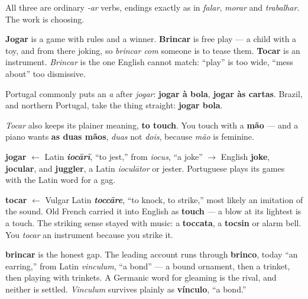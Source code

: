 All three are ordinary \emph{-ar} verbs, endings exactly as in \emph{falar}, \emph{morar} and \emph{trabalhar}. The work is choosing.

\textbf{Jogar} is a game with rules and a winner. \textbf{Brincar} is free play — a child with a toy, and from there joking, so \emph{brincar com} someone is to tease them. \textbf{Tocar} is an instrument. \emph{Brincar} is the one English cannot match: \textquotedblleft{}play\textquotedblright{} is too wide, \textquotedblleft{}mess about\textquotedblright{} too dismissive.

\begin{grammarlens}[title={Grammar Lens: Two coasts, one preposition apart}]
Portugal commonly puts an \emph{a} after \emph{jogar}: \textbf{jogar à bola}, \textbf{jogar às cartas}. Brazil, and northern Portugal, take the thing straight: \textbf{jogar bola}.

\emph{Tocar} also keeps its plainer meaning, \textbf{to touch}. You touch with a \textbf{mão} — and a piano wants \textbf{as duas mãos}, \emph{duas} not \emph{dois}, because \emph{mão} is feminine.
\end{grammarlens}

\begin{cousinweb}
\textbf{jogar} $\leftarrow$ Latin \emph{\textbf{iocārī}}, \textquotedblleft{}to jest,\textquotedblright{} from \emph{iocus}, \textquotedblleft{}a joke\textquotedblright{} $\to$ English \textbf{joke}, \textbf{jocular}, and \textbf{juggler}, a Latin \emph{ioculātor} or jester. Portuguese plays its games with the Latin word for a gag.

\textbf{tocar} $\leftarrow$ Vulgar Latin \emph{\textbf{toccāre}}, \textquotedblleft{}to knock, to strike,\textquotedblright{} most likely an imitation of the sound. Old French carried it into English as \textbf{touch} — a blow at its lightest is a touch. The striking sense stayed with music: a \textbf{toccata}, a \textbf{tocsin} or alarm bell. You \emph{tocar} an instrument because you strike it.

\textbf{brincar} is the honest gap. The leading account runs through \textbf{brinco}, today \textquotedblleft{}an earring,\textquotedblright{} from Latin \emph{vinculum}, \textquotedblleft{}a bond\textquotedblright{} — a bound ornament, then a trinket, then playing with trinkets. A Germanic word for gleaming is the rival, and neither is settled. \emph{Vinculum} survives plainly as \textbf{vínculo}, \textquotedblleft{}a bond.\textquotedblright{}
\end{cousinweb}

